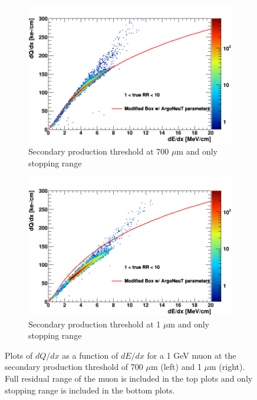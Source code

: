 \begin{figure}[tbp!]
\begin{subfigure}[b]{0.495\textwidth}
            \centering 
            \includegraphics[width=\textwidth]{mu_700um_lowRR}
            \caption{Secondary production threshold at 700 $\mu$m and only stopping range}%
            \label{fig:mu_2d_700_lowRR}
        \end{subfigure}
        \hfill
        \begin{subfigure}[b]{0.495\textwidth}   
            \centering 
            \includegraphics[width=\textwidth]{mu_1um_lowRR}
            \caption{Secondary production threshold at 1 $\mu$m and only stopping range}%
            \label{fig:mu_2d_1_lowRR}
        \end{subfigure}
        \caption{
        	Plots of $dQ/dx$ as a function of $dE/dx$ for a 1 GeV muon at the secondary production threshold of 700 $\mu$m (left) and 1 $\mu$m (right).
		Full residual range of the muon is included in the top plots and only stopping range is included in the bottom plots.
	}
        \label{fig:muon_2d}
\end{figure}
